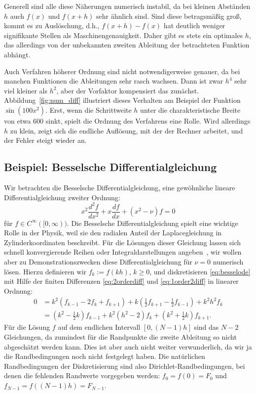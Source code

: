 Generell sind alle diese Näherungen numerisch instabil, da bei kleinen
Abständen $h$ auch $f(x)$ und $f(x+h)$ sehr ähnlich sind. Sind diese
betragsmäßig groß, kommt es zu Auslöschung, d.h., $f(x+h) - f(x)$ hat
deutlich weniger signifikante Stellen als Maschinengenauigkeit. Daher
gibt es stets ein optimales $h$, das allerdings von der unbekannten
zweiten Ableitung der betrachteten Funktion abhängt.

Auch Verfahren höherer Ordnung sind nicht notwendigerweise genauer, da
bei manchen Funktionen die Ableitungen sehr rasch wachsen. Dann ist
zwar $h^4$ sehr viel kleiner als $h^2$, aber der Vorfaktor
kompensiert das zunächst. Abbildung~\ref{fig:num_diff} illustriert
dieses Verhalten am Beispiel der Funktion $\sin(100x^2)$. Erst, wenn
die Schrittweite $h$ unter die charakteristische Breite von etwa 600
sinkt, spielt die Ordnung des Verfahrens eine Rolle. Wird allerdings
$h$ zu klein, zeigt sich die endliche Auflösung, mit der der Rechner
arbeitet, und der Fehler steigt wieder an.

\subsection{Beispiel: Besselsche Differentialgleichung}

Wir betrachten die Besselsche Differentialgleichung, eine gewöhnliche
lineare Differentialgleichung zweiter Ordnung:
\begin{equation}
  \label{eq:besselode}
  x^2\frac{d^2f}{dx^2} + x\frac{df}{dx} + (x^2-\nu)f = 0
\end{equation}
für $f\in C^{\infty}([0,\infty))$. Die Besselsche
Differentialgleichung spielt eine wichtige Rolle in der Physik, weil
sie den radialen Anteil der Laplacegleichung in Zylinderkoordinaten
beschreibt.  Für die Lösungen dieser Gleichung lassen sich schnell
konvergierende Reihen oder Integraldarstellungen
angeben~\cite{abramowitz70a,jackson99}, wir wollen aber zu
Demonstrationszwecken diese Differentialgleichung für $\nu=0$
numerisch lösen. Hierzu definieren wir $f_k := f(kh)$, $k\ge 0$, und
diskretisieren \eqref{eq:besselode} mit Hilfe der finiten Differenzen
\eqref{eq:2orderdiff} und \eqref{eq:1order2diff} in linearer Ordnung:
\begin{align}
  \label{eq:besseldiscrete}
  0 &= k^2\left(f_{k-1} - 2f_k + f_{k+1} \right)
  + k\left(\frac{1}{2} f_{k+1} - \frac{1}{2} f_{k-1}\right)
  + k^2h^2f_k\nonumber\\
  &= \left(k^2 - \frac{1}{2}k\right)f_{k-1}
  + k^2(h^2 - 2)f_k
  + \left(k^2 + \frac{1}{2}k\right)f_{k+1}.
\end{align}
Für die Lösung $f$ auf dem endlichen Intervall $[0, (N-1)h]$ sind das
$N-2$ Gleichungen, da zumindest für die Randpunkte die zweite
Ableitung so nicht abgeschätzt werden kann. Dies ist aber auch nicht
weiter verwunderlich, da wir ja die Randbedingungen noch nicht
festgelegt haben. Die natürlichen Randbedingungen der Diskretisierung
sind also Dirichlet-Randbedingungen, bei denen die fehlenden Randwerte
vorgegeben werden: $f_0 = f(0)=F_0$ und $f_{N-1} = f((N-1)h) = F_{N-1}$.

